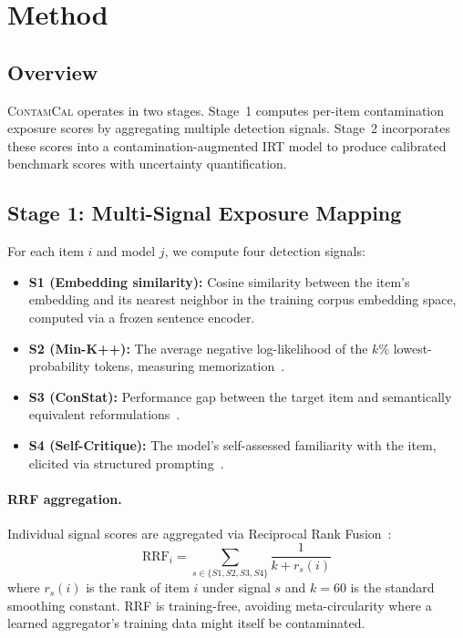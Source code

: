 \documentclass[11pt,a4paper]{article}
\newcommand{\contamcal}{\textsc{ContamCal}}
\begin{document}
\section{Method}
\label{sec:method}

\subsection{Overview}

\contamcal{} operates in two stages. Stage~1 computes per-item contamination exposure scores by aggregating multiple detection signals. Stage~2 incorporates these scores into a contamination-augmented IRT model to produce calibrated benchmark scores with uncertainty quantification.

\subsection{Stage 1: Multi-Signal Exposure Mapping}

For each item $i$ and model $j$, we compute four detection signals:

\begin{itemize}
\item \textbf{S1 (Embedding similarity):} Cosine similarity between the item's embedding and its nearest neighbor in the training corpus embedding space, computed via a frozen sentence encoder.
\item \textbf{S2 (Min-K++):} The average negative log-likelihood of the $k$\% lowest-probability tokens, measuring memorization~\citep{zhang2024minkpp}.
\item \textbf{S3 (ConStat):} Performance gap between the target item and semantically equivalent reformulations~\citep{dekoninck2024constat}.
\item \textbf{S4 (Self-Critique):} The model's self-assessed familiarity with the item, elicited via structured prompting~\citep{weller2024selfcritique}.
\end{itemize}

\paragraph{RRF aggregation.}
Individual signal scores are aggregated via Reciprocal Rank Fusion~\citep{cormack2009reciprocal}:
\begin{equation}
\text{RRF}_i = \sum_{s \in \{S1, S2, S3, S4\}} \frac{1}{k + r_s(i)}
\end{equation}
where $r_s(i)$ is the rank of item $i$ under signal $s$ and $k=60$ is the standard smoothing constant. RRF is training-free, avoiding meta-circularity where a learned aggregator's training data might itself be contaminated.
\end{document}
